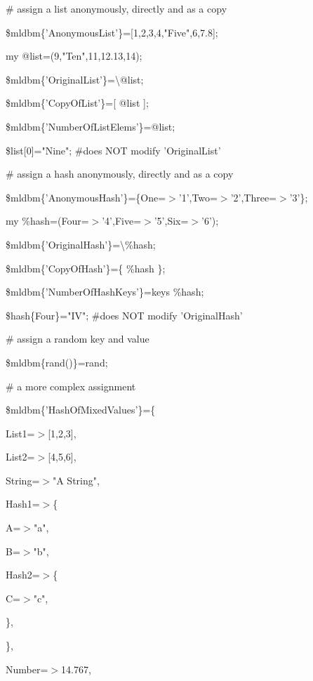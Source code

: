 \documentclass[a4paper,11pt]{book}
\begin{document}
\noindent 

\noindent \# assign a list anonymously, directly and as a copy

\noindent \$mldbm\{'AnonymousList'\}=[1,2,3,4,"Five",6,7.8];

\noindent my @list=(9,"Ten",11,12.13,14);

\noindent \$mldbm\{'OriginalList'\}=\textbackslash @list;

\noindent \$mldbm\{'CopyOfList'\}=[ @list ];

\noindent \$mldbm\{'NumberOfListElems'\}=@list;

\noindent \$list[0]="Nine"; \#does NOT modify 'OriginalList'

\noindent 

\noindent \# assign a hash anonymously, directly and as a copy

\noindent \$mldbm\{'AnonymousHash'\}=\{One=$>$'1',Two=$>$'2',Three=$>$'3'\};

\noindent my \%hash=(Four=$>$'4',Five=$>$'5',Six=$>$'6');

\noindent \$mldbm\{'OriginalHash'\}=\textbackslash \%hash;

\noindent \$mldbm\{'CopyOfHash'\}=\{ \%hash \};

\noindent \$mldbm\{'NumberOfHashKeys'\}=keys \%hash;

\noindent \$hash\{Four\}="IV"; \#does NOT modify 'OriginalHash'

\noindent 

\noindent \# assign a random key and value

\noindent \$mldbm\{rand()\}=rand;

\noindent 

\noindent \# a more complex assignment

\noindent \$mldbm\{'HashOfMixedValues'\}=\{

\noindent List1=$>$[1,2,3],

\noindent List2=$>$[4,5,6],

\noindent String=$>$"A String",

\noindent Hash1=$>$\{

\noindent A=$>$"a",

\noindent B=$>$"b",

\noindent Hash2=$>$\{

\noindent C=$>$"c",

\noindent \},

\noindent \},

\noindent Number=$>$14.767,
\end{document}
